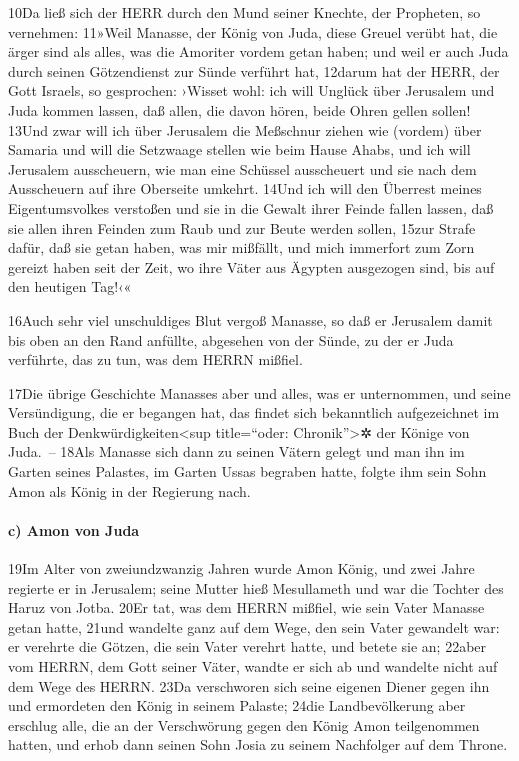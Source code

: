 10Da ließ sich der HERR durch den Mund seiner Knechte, der Propheten, so
vernehmen: 11»Weil Manasse, der König von Juda, diese Greuel verübt hat,
die ärger sind als alles, was die Amoriter vordem getan haben; und weil
er auch Juda durch seinen Götzendienst zur Sünde verführt hat, 12darum
hat der HERR, der Gott Israels, so gesprochen: ›Wisset wohl: ich will
Unglück über Jerusalem und Juda kommen lassen, daß allen, die davon
hören, beide Ohren gellen sollen! 13Und zwar will ich über Jerusalem die
Meßschnur ziehen wie (vordem) über Samaria und will die Setzwaage
stellen wie beim Hause Ahabs, und ich will Jerusalem ausscheuern, wie
man eine Schüssel ausscheuert und sie nach dem Ausscheuern auf ihre
Oberseite umkehrt. 14Und ich will den Überrest meines Eigentumsvolkes
verstoßen und sie in die Gewalt ihrer Feinde fallen lassen, daß sie
allen ihren Feinden zum Raub und zur Beute werden sollen, 15zur Strafe
dafür, daß sie getan haben, was mir mißfällt, und mich immerfort zum
Zorn gereizt haben seit der Zeit, wo ihre Väter aus Ägypten ausgezogen
sind, bis auf den heutigen Tag!‹«

16Auch sehr viel unschuldiges Blut vergoß Manasse, so daß er Jerusalem
damit bis oben an den Rand anfüllte, abgesehen von der Sünde, zu der er
Juda verführte, das zu tun, was dem HERRN mißfiel.

17Die übrige Geschichte Manasses aber und alles, was er unternommen, und
seine Versündigung, die er begangen hat, das findet sich bekanntlich
aufgezeichnet im Buch der Denkwürdigkeiten\textless sup title=``oder:
Chronik''\textgreater✲ der Könige von Juda.~-- 18Als Manasse sich dann
zu seinen Vätern gelegt und man ihn im Garten seines Palastes, im Garten
Ussas begraben hatte, folgte ihm sein Sohn Amon als König in der
Regierung nach.

\hypertarget{c-amon-von-juda}{%
\paragraph{c) Amon von Juda}\label{c-amon-von-juda}}

19Im Alter von zweiundzwanzig Jahren wurde Amon König, und zwei Jahre
regierte er in Jerusalem; seine Mutter hieß Mesullameth und war die
Tochter des Haruz von Jotba. 20Er tat, was dem HERRN mißfiel, wie sein
Vater Manasse getan hatte, 21und wandelte ganz auf dem Wege, den sein
Vater gewandelt war: er verehrte die Götzen, die sein Vater verehrt
hatte, und betete sie an; 22aber vom HERRN, dem Gott seiner Väter,
wandte er sich ab und wandelte nicht auf dem Wege des HERRN. 23Da
verschworen sich seine eigenen Diener gegen ihn und ermordeten den König
in seinem Palaste; 24die Landbevölkerung aber erschlug alle, die an der
Verschwörung gegen den König Amon teilgenommen hatten, und erhob dann
seinen Sohn Josia zu seinem Nachfolger auf dem Throne.

